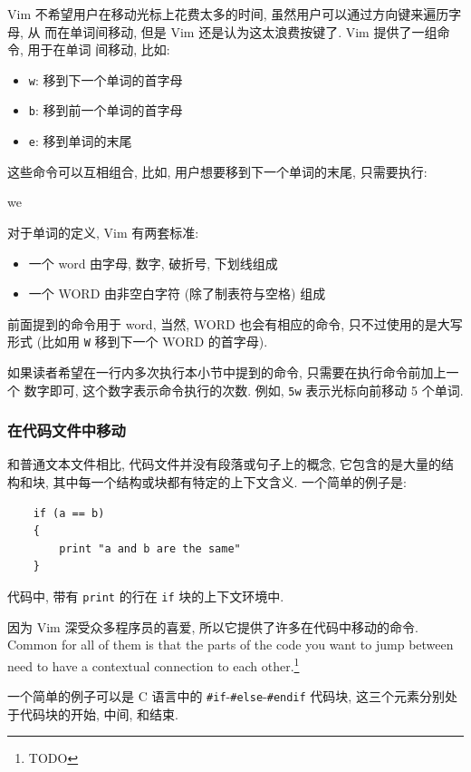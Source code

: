 Vim 不希望用户在移动光标上花费太多的时间, 虽然用户可以通过方向键来遍历字母, 从
而在单词间移动, 但是 Vim 还是认为这太浪费按键了. Vim 提供了一组命令, 用于在单词
间移动, 比如:
\begin{itemize}
    \item \texttt{w}: 移到下一个单词的首字母
    \item \texttt{b}: 移到前一个单词的首字母
    \item \texttt{e}: 移到单词的末尾
\end{itemize}
这些命令可以互相组合, 比如, 用户想要移到下一个单词的末尾, 只需要执行:
\begin{vimcode}
we
\end{vimcode}

对于单词的定义, Vim 有两套标准:
\begin{itemize}
    \item 一个 word 由字母, 数字, 破折号, 下划线组成
    \item 一个 WORD 由非空白字符 (除了制表符与空格) 组成
\end{itemize}
前面提到的命令用于 word, 当然, WORD 也会有相应的命令, 只不过使用的是大写形式
(比如用 \texttt{W} 移到下一个 WORD 的首字母).
\begin{warning}
    如果读者希望在一行内多次执行本小节中提到的命令, 只需要在执行命令前加上一个
    数字即可, 这个数字表示命令执行的次数. 例如, \texttt{5w} 表示光标向前移动 5
    个单词.
\end{warning}

\subsubsection{在代码文件中移动}
\label{subsubsec:moving_in_a_code_file}

和普通文本文件相比, 代码文件并没有段落或句子上的概念, 它包含的是大量的结构和块,
其中每一个结构或块都有特定的上下文含义. 一个简单的例子是:
\begin{verbatim}
    if (a == b)
    {
        print "a and b are the same"
    }
\end{verbatim}
代码中, 带有 \texttt{print} 的行在 \texttt{if} 块的上下文环境中.

因为 Vim 深受众多程序员的喜爱, 所以它提供了许多在代码中移动的命令. Common for
all of them is that the parts of the code you want to jump between need to have
a contextual connection to each other.\footnote{TODO}

一个简单的例子可以是 C 语言中的 \texttt{\#if}-\texttt{\#else}-\texttt{\#endif}
代码块, 这三个元素分别处于代码块的开始, 中间, 和结束.

